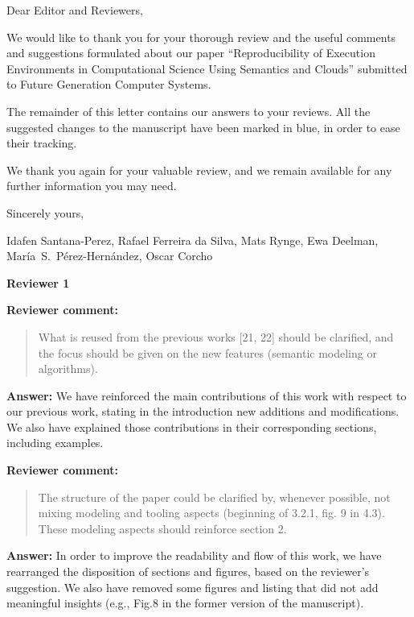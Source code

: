 \documentclass{letter}
\date{Sep 23, 2015}
\newenvironment{review}%
{\textbf{Reviewer comment:}\begin{quote}}%
{\end{quote}}%
\newcommand{\answer}[1]{%
      \textbf{Answer:} #1}
\newcommand{\revised}[1]{\emph{#1}\color{black}}
\begin{document}
\begin{letter}{}

\opening{Dear Editor and Reviewers,}

We would like to thank you for your thorough review and the useful
comments and suggestions formulated about our paper 
``Reproducibility of Execution Environments in Computational Science Using Semantics and Clouds'' 
submitted to Future Generation Computer Systems.

The remainder of this letter contains our answers to your reviews. All the suggested changes to the manuscript have been marked in blue, in order to ease their tracking.

We thank you again for your valuable review, and we remain available for any further information you may need.

\vspace{0.5cm}

Sincerely yours,

\vspace{1cm}

Idafen Santana-Perez, Rafael Ferreira da Silva, Mats Rynge, Ewa Deelman, Mar\'ia~S.~P\'erez-Hern\'andez, Oscar Corcho

\newpage


%
%
\textbf{Reviewer 1}

\begin{review}
What is reused from the previous works [21, 22] should be clarified, and the focus should be given on the new features (semantic modeling or algorithms).
\end{review}

\answer{We have reinforced the main contributions of this work with respect to our previous work, stating in the introduction new additions and modifications. We also have explained those contributions in their corresponding sections, including examples.}



\begin{review}
The structure of the paper could be clarified by, whenever possible, not mixing modeling and tooling aspects (beginning of 3.2.1, fig. 9 in 4.3). These modeling aspects should reinforce section 2.
\end{review}

\answer{In order to improve the readability and flow of this work, we have rearranged the disposition of sections and figures, based on the reviewer's suggestion. We also have removed some figures and listing that did not add meaningful insights (e.g., Fig.8 in the former version of the manuscript).}



\end{letter}
\end{document}
